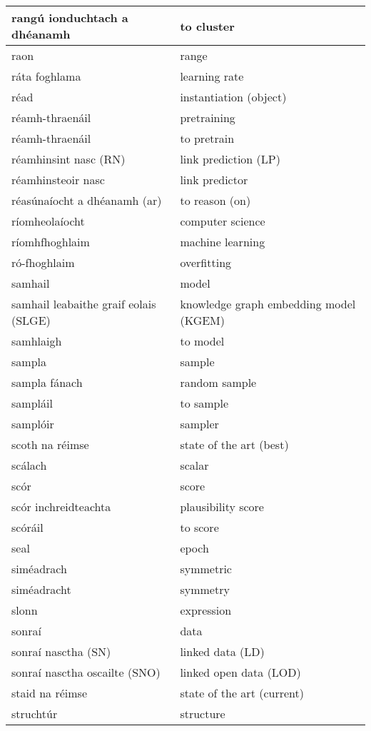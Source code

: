 \documentclass{article}
\begin{document}
\begin{longtable}{|l|l|}
		rangú ionduchtach a dhéanamh&to cluster\\ \hline 
		raon&range\\ \hline 
		ráta foghlama&learning rate\\ \hline 
		réad&instantiation (object)\\ \hline 
		réamh-thraenáil&pretraining\\ \hline 
		réamh-thraenáil&to pretrain\\ \hline 
		réamhinsint nasc (RN)&link prediction (LP)\\ \hline 
		réamhinsteoir nasc&link predictor\\ \hline 
		réasúnaíocht a dhéanamh (ar)&to reason (on)\\ \hline 
		ríomheolaíocht&computer science\\ \hline 
		ríomhfhoghlaim&machine learning\\ \hline 
		ró-fhoghlaim&overfitting\\ \hline 
		samhail&model\\ \hline 
		samhail leabaithe graif eolais (SLGE)&knowledge graph embedding model (KGEM)\\ \hline 
		samhlaigh&to model\\ \hline 
		sampla&sample\\ \hline 
		sampla fánach&random sample\\ \hline 
		sampláil&to sample\\ \hline 
		samplóir&sampler\\ \hline 
		scoth na réimse&state of the art (best)\\ \hline 
		scálach&scalar\\ \hline 
		scór&score\\ \hline 
		scór inchreidteachta&plausibility score\\ \hline 
		scóráil&to score\\ \hline 
		seal&epoch\\ \hline 
		siméadrach&symmetric\\ \hline 
		siméadracht&symmetry\\ \hline 
		slonn&expression\\ \hline 
		sonraí&data\\ \hline 
		sonraí nasctha (SN)&linked data (LD)\\ \hline 
		sonraí nasctha oscailte (SNO)&linked open data (LOD)\\ \hline 
		staid na réimse&state of the art (current)\\ \hline 
		struchtúr&structure\\ \hline 

\end{longtable}
\end{document}
